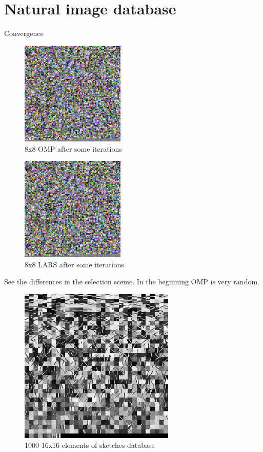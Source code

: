 \section{Natural image database}

Convergence

\begin{figure}[h]
\centering
\includegraphics[width = 0.44\textwidth]{images/8_4000_10000_10_lasso.png} 
\caption{8x8 OMP after some iterations}
\label{fig:8_4000_lasso}
\end{figure}

\begin{figure}[h]
\centering
\includegraphics[width = 0.44\textwidth]{images/8_4000_10000_10_lasso.png} 
\caption{8x8 LARS after some iterations}
\label{fig:8_4000_lasso}
\end{figure}

See the differences in the selection sceme.
In the beginning OMP is very random.

\begin{figure}[h]
\centering
\includegraphics[width = 0.66\textwidth]{images/1000_sketches.png}
\caption{1000 16x16 elements of sketches database}
\label{fig:16_1000_lasso}
\end{figure}

